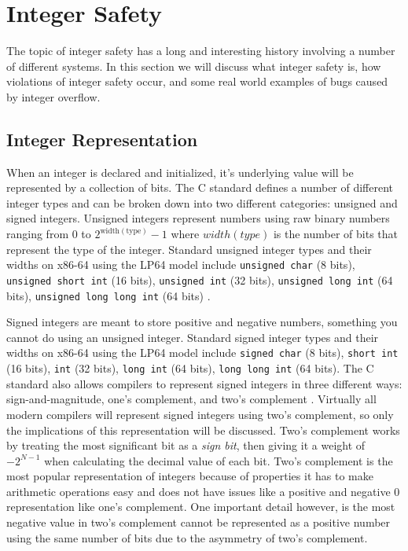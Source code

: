 \section{Integer Safety}

The topic of integer safety has a long and interesting history involving a number of different systems. In this section we will discuss what integer safety is, how violations of integer safety occur, and some real world examples of bugs caused by integer overflow.

\subsection{Integer Representation}

When an integer is declared and initialized, it's underlying value will be represented by a collection of bits. The C standard defines a number of different integer types and can be broken down into two different categories: unsigned and signed integers. Unsigned integers represent numbers using raw binary numbers ranging from 0 to $2^{\text{width}(\text{type})} - 1$ where $width(type)$ is the number of bits that represent the type of the integer. Standard unsigned integer types and their widths on x86-64 using the LP64 model include \texttt{unsigned char} (8 bits), \texttt{unsigned short int} (16 bits), \texttt{unsigned int} (32 bits), \texttt{unsigned long int} (64 bits), \texttt{unsigned long long int} (64 bits) \cite{LP64}.

Signed integers are meant to store positive and negative numbers, something you cannot do using an unsigned integer. Standard signed integer types and their widths on x86-64 using the LP64 model include \texttt{signed char} (8 bits), \texttt{short int} (16 bits), \texttt{int} (32 bits), \texttt{long int} (64 bits), \texttt{long long int} (64 bits). The C standard also allows compilers to represent signed integers in three different ways: sign-and-magnitude, one's complement, and two's complement \cite{c_standard}. Virtually all modern compilers will represent signed integers using two's complement, so only the implications of this representation will be discussed. Two's complement works by treating the most significant bit as a \textit{sign bit}, then giving it a weight of $-2^{N - 1}$ when calculating the decimal value of each bit. Two's complement is the most popular representation of integers because of properties it has to make arithmetic operations easy and does not have issues like a positive and negative 0 representation like one's complement. One important detail however, is the most negative value in two's complement cannot be represented as a positive number using the same number of bits due to the asymmetry of two's complement.

